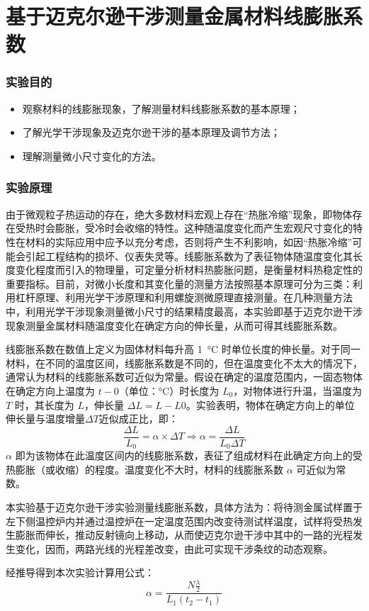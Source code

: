 \documentclass[a4paper,utf8]{article}
\begin{document}
\part{基于迈克尔逊干涉测量金属材料线膨胀系数}
\setcounter{section}{0}
\section{实验目的}
    \begin{itemize}
        \item 观察材料的线膨胀现象，了解测量材料线膨胀系数的基本原理；
        \item 了解光学干涉现象及迈克尔逊干涉的基本原理及调节方法； 
        \item 理解测量微小尺寸变化的方法。
    \end{itemize}
\section{实验原理}%
    由于微观粒子热运动的存在，绝大多数材料宏观上存在“热胀冷缩”现象，即物体存在受热时会膨胀，受冷时会收缩的特性。这种随温度变化而产生宏观尺寸变化的特性在材料的实际应用中应予以充分考虑，否则将产生不利影响，如因“热胀冷缩”可能会引起工程结构的损坏、仪表失灵等。线膨胀系数为了表征物体随温度变化其长度变化程度而引入的物理量，可定量分析材料热膨胀问题，是衡量材料热稳定性的重要指标。目前，对微小长度和其变化量的测量方法按照基本原理可分为三类：利用杠杆原理、利用光学干涉原理和利用螺旋测微原理直接测量。在几种测量方法中，利用光学干涉现象测量微小尺寸的结果精度最高，本实验即基于迈克尔逊干涉现象测量金属材料随温度变化在确定方向的伸长量，从而可得其线膨胀系数。\par
    线膨胀系数在数值上定义为固体材料每升高 \SI{1}{\degreeCelsius} 时单位长度的伸长量。对于同一材料，在不同的温度区间，线膨胀系数是不同的，但在温度变化不太大的情况下，通常认为材料的线膨胀系数可近似为常量。假设在确定的温度范围内，一固态物体在确定方向上温度为 $t-0$（单位：\unit{\degreeCelsius}）时长度为 $L_0$，对物体进行升温，当温度为 $T$ 时，其长度为 $L$，伸长量 $\varDelta L=L-L0$。实验表明，物体在确定方向上的单位伸长量与温度增量$\varDelta T$近似成正比，即：
    \begin{equation}
        \frac{\varDelta L}{L_0} = \alpha \times \varDelta T \Longrightarrow  \alpha=\frac{\varDelta L}{L_0 \varDelta T}
    \end{equation}
    $\alpha$ 即为该物体在此温度区间内的线膨胀系数，表征了组成材料在此确定方向上的受热膨胀（或收缩）的程度。温度变化不大时，材料的线膨胀系数 $\alpha$ 可近似为常数。\par
    本实验基于迈克尔逊干涉实验测量线膨胀系数，具体方法为：将待测金属试样置于左下侧温控炉内并通过温控炉在一定温度范围内改变待测试样温度，试样将受热发生膨胀而伸长，推动反射镜向上移动，从而使迈克尔逊干涉中其中的一路的光程发生变化，因而，两路光线的光程差改变，由此可实现干涉条纹的动态观察。\par
    经推导得到本次实验计算用公式：
    \begin{equation}
        \alpha=\frac{N\frac\lambda2}{L_1(t_2-t_1)}
    \end{equation}
\end{document}
